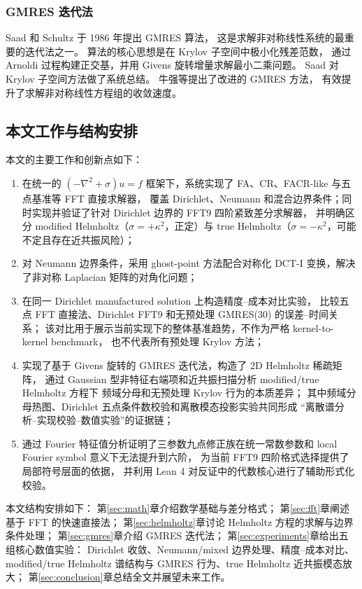 \subsubsection{GMRES 迭代法}

Saad 和 Schultz \cite{SaadSchultz1986} 于 1986 年提出 GMRES 算法，
这是求解非对称线性系统的最重要的迭代法之一。
算法的核心思想是在 Krylov 子空间中极小化残差范数，
通过 Arnoldi 过程构建正交基，并用 Givens 旋转增量求解最小二乘问题。
Saad \cite{Saad2003} 对 Krylov 子空间方法做了系统总结。
牛强等\cite{Niu2009}提出了改进的 GMRES 方法，
有效提升了求解非对称线性方程组的收敛速度。

\subsection{本文工作与结构安排}

本文的主要工作和创新点如下：

\begin{enumerate}[itemsep=2pt]
  \item 在统一的 $(-\nabla^2+\sigma)u=f$ 框架下，系统实现了 FA、CR、FACR-like 与五点基准等 FFT 直接求解器，
        覆盖 Dirichlet、Neumann 和混合边界条件；同时实现并验证了针对 Dirichlet 边界的 FFT9 四阶紧致差分求解器，
        并明确区分 modified Helmholtz（$\sigma=+\kappa^2$，正定）与 true Helmholtz（$\sigma=-\kappa^2$，可能不定且存在近共振风险）；
  \item 对 Neumann 边界条件，采用 ghost-point 方法配合对称化 DCT-I 变换，解决了非对称 Laplacian 矩阵的对角化问题；
  \item 在同一 Dirichlet manufactured solution 上构造精度--成本对比实验，
        比较五点 FFT 直接法、Dirichlet FFT9 和无预处理 GMRES(30) 的误差--时间关系；
        该对比用于展示当前实现下的整体基准趋势，不作为严格 kernel-to-kernel benchmark，
        也不代表所有预处理 Krylov 方法；
  \item 实现了基于 Givens 旋转的 GMRES 迭代法，构造了 2D Helmholtz 稀疏矩阵，
        通过 Gaussian 型非特征右端项和近共振扫描分析 modified/true Helmholtz 方程下
        频域分母和无预处理 Krylov 行为的本质差异；
        其中频域分母热图、Dirichlet 五点条件数校验和离散模态投影实验共同形成
        “离散谱分析--实现校验--数值实验”的证据链；
  \item 通过 Fourier 特征值分析证明了三参数九点修正族在统一常数参数和
        local Fourier symbol 意义下无法提升到六阶，
        为当前 FFT9 四阶格式选择提供了局部符号层面的依据，
        并利用 Lean 4 对反证中的代数核心进行了辅助形式化校验。
\end{enumerate}

本文结构安排如下：
第\ref{sec:math}章介绍数学基础与差分格式；
第\ref{sec:fft}章阐述基于 FFT 的快速直接法；
第\ref{sec:helmholtz}章讨论 Helmholtz 方程的求解与边界条件处理；
第\ref{sec:gmres}章介绍 GMRES 迭代法；
第\ref{sec:experiments}章给出五组核心数值实验：
Dirichlet 收敛、Neumann/mixed 边界处理、精度--成本对比、
modified/true Helmholtz 谱结构与 GMRES 行为、true Helmholtz 近共振模态放大；
第\ref{sec:conclusion}章总结全文并展望未来工作。
